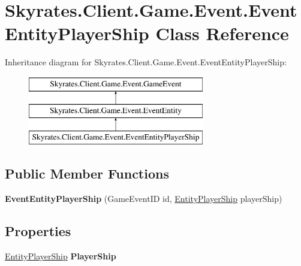 \hypertarget{class_skyrates_1_1_client_1_1_game_1_1_event_1_1_event_entity_player_ship}{\section{Skyrates.\-Client.\-Game.\-Event.\-Event\-Entity\-Player\-Ship Class Reference}
\label{class_skyrates_1_1_client_1_1_game_1_1_event_1_1_event_entity_player_ship}
}
Inheritance diagram for Skyrates.\-Client.\-Game.\-Event.\-Event\-Entity\-Player\-Ship\-:\begin{figure}[H]
\begin{center}
\leavevmode
\includegraphics[height=3.000000cm]{class_skyrates_1_1_client_1_1_game_1_1_event_1_1_event_entity_player_ship}
\end{center}
\end{figure}
\subsection*{Public Member Functions}
\begin{DoxyCompactItemize}
\item 
\hypertarget{class_skyrates_1_1_client_1_1_game_1_1_event_1_1_event_entity_player_ship_a834396c60fe40f7782c5a8f506068d25}{{\bfseries Event\-Entity\-Player\-Ship} (Game\-Event\-I\-D id, \hyperlink{class_skyrates_1_1_client_1_1_entity_player_ship}{Entity\-Player\-Ship} player\-Ship)}\label{class_skyrates_1_1_client_1_1_game_1_1_event_1_1_event_entity_player_ship_a834396c60fe40f7782c5a8f506068d25}

\end{DoxyCompactItemize}
\subsection*{Properties}
\begin{DoxyCompactItemize}
\item 
\hypertarget{class_skyrates_1_1_client_1_1_game_1_1_event_1_1_event_entity_player_ship_a6f84598b8e589eeb0e102fcda0a322b9}{\hyperlink{class_skyrates_1_1_client_1_1_entity_player_ship}{Entity\-Player\-Ship} {\bfseries Player\-Ship}}\label{class_skyrates_1_1_client_1_1_game_1_1_event_1_1_event_entity_player_ship_a6f84598b8e589eeb0e102fcda0a322b9}

\end{DoxyCompactItemize}
